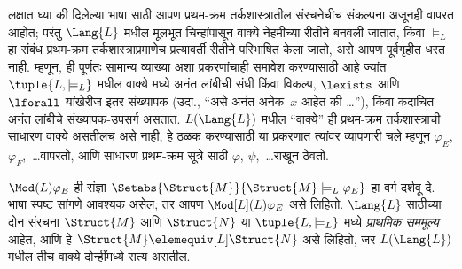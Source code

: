 लक्षात घ्या की दिलेल्या भाषा साठी आपण प्रथम-क्रम तर्कशास्त्रातील
संरचनेचीच संकल्पना अजूनही वापरत आहोत; परंतु $\Lang{L}$ मधील
मूलभूत चिन्हांपासून वाक्ये नेहमीच्या रीतीने बनवली जातात, किंवा
$\models_L$ हा संबंध प्रथम-क्रम तर्कशास्त्राप्रमाणेच प्रत्यावर्ती रीतीने
परिभाषित केला जातो, असे आपण पूर्वगृहीत धरत नाही. म्हणून, ही पूर्णतः
सामान्य व्याख्या अशा प्रकरणांचाही समावेश करण्यासाठी आहे ज्यांत
$\tuple{L,\models_L}$ मधील वाक्ये मध्ये अनंत लांबीची संधी किंवा
विकल्प, $\lexists$ आणि $\lforall$ यांखेरीज इतर संख्यापक (उदा.,
``असे अनंत अनेक~$x$ आहेत की \dots''), किंवा कदाचित अनंत लांबीचे
संख्यापक-उपसर्ग असतात. $L(\Lang{L})$ मधील ``वाक्ये'' ही
प्रथम-क्रम तर्कशास्त्राची साधारण वाक्ये असतीलच असे नाही, हे
ठळक करण्यासाठी या प्रकरणात त्यांवर व्यापणारी चले म्हणून $\varphi_{E}$,
$\varphi_{F}$,~\dots वापरतो, आणि साधारण प्रथम-क्रम सूत्रे साठी $\varphi$,
$\psi$,~\dots राखून ठेवतो.

\begin{defn}
$\Mod(L){\varphi_{E}}$ ही संज्ञा $\Setabs{\Struct{M}}{\Struct{M}
  \models_L \varphi_{E}}$ हा वर्ग दर्शवू दे. भाषा स्पष्ट सांगणे आवश्यक
असेल, तर आपण $\Mod[L](L){\varphi_{E}}$ असे लिहितो. $\Lang{L}$ साठीच्या दोन
संरचना $\Struct{M}$ आणि $\Struct{N}$ या $\tuple{L, \models_L}$
मध्ये \emph{प्राथमिक सममूल्य} आहेत, आणि हे $\Struct{M} \elemequiv[L]
\Struct{N}$ असे लिहितो, जर $L(\Lang{L})$ मधील तीच वाक्ये
दोन्हींमध्ये सत्य असतील.
\end{defn}


